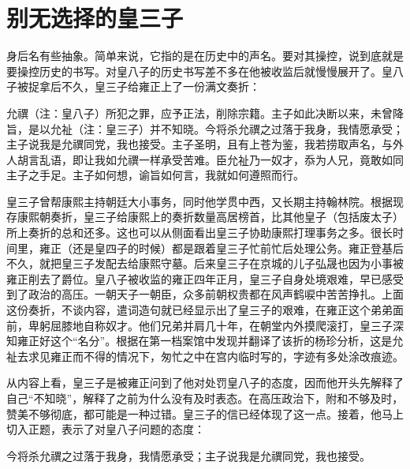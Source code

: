 \section{别无选择的皇三子}


身后名有些抽象。简单来说，它指的是在历史中的声名。要对其操控，说到底就是要操控历史的书写。对皇八子的历史书写差不多在他被收监后就慢慢展开了。皇八子被捉拿后不久，皇三子给雍正上了一份满文奏折：



\begin{bookquote}允禩（注：皇八子）所犯之罪，应予正法，削除宗籍。主子如此决断以来，未曾降旨，是以允祉（注：皇三子）并不知晓。今将杀允禩之过落于我身，我情愿承受；主子说我是允禩同党，我也接受。主子圣明，且有上苍为鉴，我若捞取声名，与外人胡言乱语，即让我如允禩一样承受苦难。臣允祉乃一奴才，忝为人兄，竟敢如同主子之手足。主子如何想，谕旨如何言，我就如何遵照而行。\end{bookquote}


皇三子曾帮康熙主持朝廷大小事务，同时他学贯中西，又长期主持翰林院。根据现存康熙朝奏折，皇三子给康熙上的奏折数量高居榜首，比其他皇子（包括废太子）所上奏折的总和还多。这也可以从侧面看出皇三子协助康熙打理事务之多。很长时间里，雍正（还是皇四子的时候）都是跟着皇三子忙前忙后处理公务。雍正登基后不久，就把皇三子发配去给康熙守墓。后来皇三子在京城的儿子弘晟也因为小事被雍正削去了爵位。皇八子被收监的雍正四年正月，皇三子自身处境艰难，早已感受到了政治的高压。一朝天子一朝臣，众多前朝权贵都在风声鹤唳中苦苦挣扎。上面这份奏折，不谈内容，遣词造句就已经显示出了皇三子的艰难，在雍正这个弟弟面前，卑躬屈膝地自称奴才。他们兄弟并肩几十年，在朝堂内外摸爬滚打，皇三子深知雍正好这个“名分”。根据在第一档案馆中发现并翻译了该折的杨珍分析，这是允祉去求见雍正而不得的情况下，匆忙之中在宫内临时写的，字迹有多处涂改痕迹。



从内容上看，皇三子是被雍正问到了他对处罚皇八子的态度，因而他开头先解释了自己“不知晓”，解释了之前为什么没有及时表态。在高压政治下，附和不够及时，赞美不够彻底，都可能是一种过错。皇三子的信已经体现了这一点。接着，他马上切入正题，表示了对皇八子问题的态度：



\begin{bookquote}今将杀允禩之过落于我身，我情愿承受；主子说我是允禩同党，我也接受。\end{bookquote}


